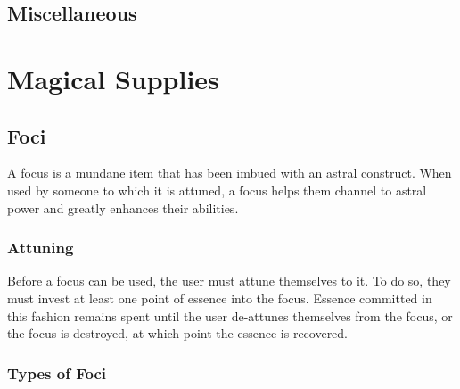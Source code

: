 \subsection{Miscellaneous}




\section{Magical Supplies}

\subsection{Foci}
A focus is a mundane item that has been imbued with an astral construct. When used by someone to which it is attuned, a focus helps them channel to astral power and greatly enhances their abilities.

\subsubsection{Attuning}
Before a focus can be used, the user must attune themselves to it. To do so, they must invest at least one point of essence into the focus. Essence committed in this fashion remains spent until the user de-attunes themselves from the focus, or the focus is destroyed, at which point the essence is recovered.

\subsubsection{Types of Foci}
